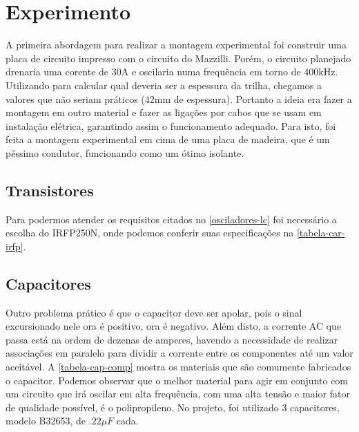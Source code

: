 \chapter{Experimento}
A primeira abordagem para realizar a montagem experimental foi construir uma placa de circuito impresso com o circuito do Mazzilli. Porém, o circuito planejado drenaria uma corente de 30A e oscilaria numa frequência em torno de 400kHz. Utilizando \cite{pcbtrace} para calcular qual deveria ser a espessura da trilha, chegamos a valores que não seriam práticos ($42$mm de espessura). Portanto a ideia era fazer a montagem em outro material e fazer as ligações por cabos que se usam em instalação elétrica, garantindo assim o funcionamento adequado. Para isto, foi feita a montagem experimental em cima de uma placa de madeira, que é um péssimo condutor, funcionando como um ótimo isolante. 
\section{Transistores}
Para podermos atender os requisitos citados no \autoref{osciladores-lc} foi necessário a escolha do IRFP250N, onde podemos conferir suas especificações na \autoref{tabela-car-irfp}.


\begin{table}[htb]
\end{table}


\section{Capacitores}
Outro problema prático é que o capacitor deve ser apolar, pois o sinal excursionado nele ora é positivo, ora é negativo. Além disto, a corrente AC que passa está na ordem de dezenas de amperes, havendo a necessidade de realizar associações em paralelo para dividir a corrente entre os componentes até um valor aceitável. A \autoref{tabela-cap-comp} mostra os materiais que são comumente fabricados o capacitor. Podemos observar que o melhor material para agir em conjunto com um circuito que irá oscilar em alta frequência, com uma alta tensão e maior fator de qualidade possível, é o polipropileno. No projeto, foi utilizado 3 capacitores, modelo B32653, de  $.22\mu F$ cada.



